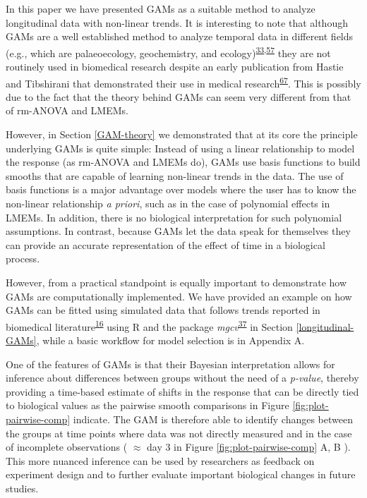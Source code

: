 \documentclass[
]{article}
\begin{document}
In this paper we have presented GAMs as a suitable method to analyze longitudinal data with non-linear trends. It is interesting to note that although GAMs are a well established method to analyze temporal data in different fields (e.g., which are palaeoecology, geochemistry, and ecology)\textsuperscript{\protect\hyperlink{ref-pedersen2019}{33},\protect\hyperlink{ref-hefley2017}{57}} they are not routinely used in biomedical research despite an early publication from Hastie and Tibshirani that demonstrated their use in medical research\textsuperscript{\protect\hyperlink{ref-hastie1995}{67}}. This is possibly due to the fact that the theory behind GAMs can seem very different from that of rm-ANOVA and LMEMs.

However, in Section \ref{GAM-theory} we demonstrated that at its core the principle underlying GAMs is quite simple: Instead of using a linear relationship to model the response (as rm-ANOVA and LMEMs do), GAMs use basis functions to build smooths that are capable of learning non-linear trends in the data. The use of basis functions is a major advantage over models where the user has to know the non-linear relationship \emph{a priori}, such as in the case of polynomial effects in LMEMs. In addition, there is no biological interpretation for such polynomial assumptions. In contrast, because GAMs let the data speak for themselves they can provide an accurate representation of the effect of time in a biological process.

However, from a practical standpoint is equally important to demonstrate how GAMs are computationally implemented. We have provided an example on how GAMs can be fitted using simulated data that follows trends reported in biomedical literature\textsuperscript{\protect\hyperlink{ref-vishwanath2009}{16}} using R and the package \emph{mgcv}\textsuperscript{\protect\hyperlink{ref-wood2017}{37}} in Section \ref{longitudinal-GAMs}, while a basic workflow for model selection is in Appendix A.

One of the features of GAMs is that their Bayesian interpretation allows for inference about differences between groups without the need of a \emph{p-value}, thereby providing a time-based estimate of shifts in the response that can be directly tied to biological values as the pairwise smooth comparisons in Figure \ref{fig:plot-pairwise-comp} indicate. The GAM is therefore able to identify changes between the groups at time points where data was not directly measured and in the case of incomplete observations ( \(\approx\) day 3 in Figure \ref{fig:plot-pairwise-comp} A, B ). This more nuanced inference can be used by researchers as feedback on experiment design and to further evaluate important biological changes in future studies.
\end{document}
